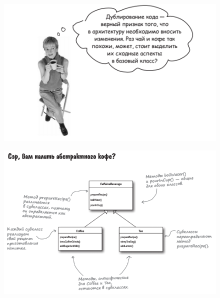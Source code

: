 \documentclass{beamer}
\begin{document}
\begin{frame}
\begin{figure}[h]
\centering
\includegraphics[scale=1.0]{images/lec12-pic05.png}
\label{pic-sort}
\end{figure}
\end{frame}

\begin{frame}
\begin{figure}[h]
\centering
\includegraphics[scale=0.6]{images/lec12-pic06.png}
\label{pic-sort}
\end{figure}
\end{frame}
\end{document}
